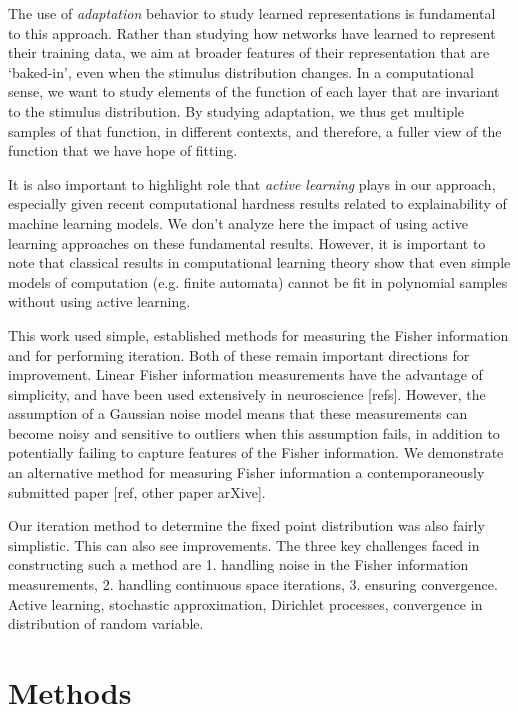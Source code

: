 \documentclass[10pt, twocolumn]{article}      %
\begin{document}
The use of \textit{adaptation} behavior to study learned representations is fundamental to this approach.
Rather than studying how networks have learned to represent their training data, we aim at broader features of their representation that are `baked-in', even when the stimulus distribution changes.
In a computational sense, we want to study elements of the function of each layer that are invariant to the stimulus distribution.
By studying adaptation, we thus get multiple samples of that function, in different contexts, and therefore, a fuller view of the function that we have hope of fitting.

It is also important to highlight role that \textit{active learning} plays in our approach, especially given recent computational hardness results \cite{goldwasser_planting_2022} related to explainability of machine learning models.
We don't analyze here the impact of using active learning approaches on these fundamental results.
However, it is important to note that classical results in computational learning theory \cite{kearns1994introduction} show that even simple models of computation (e.g. finite automata) cannot be fit in polynomial samples without using active learning.



This work used simple, established methods for measuring the Fisher information and for performing iteration.
Both of these remain important directions for improvement.
Linear Fisher information measurements have the advantage of simplicity, and have been used extensively in neuroscience [refs].
However, the assumption of a Gaussian noise model means that these measurements can become noisy and sensitive to outliers when this assumption fails, in addition to potentially failing to capture features of the Fisher information.
We demonstrate an alternative method for measuring Fisher information a contemporaneously submitted paper [ref, other paper arXive].

Our iteration method to determine the fixed point distribution was also fairly simplistic.
This can also see improvements.
The three key challenges faced in constructing such a method are 1. handling noise in the Fisher information measurements, 2. handling continuous space iterations, 3. ensuring convergence. 
Active learning, stochastic approximation, Dirichlet processes, convergence in distribution of random variable.



\section{Methods}
\end{document}
